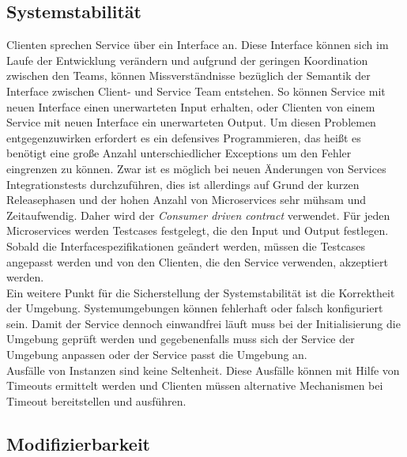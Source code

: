 \subsection{Systemstabilität}

Clienten sprechen Service über ein Interface an. Diese Interface können sich im Laufe der Entwicklung verändern und aufgrund der geringen Koordination zwischen den Teams, können Missverständnisse bezüglich der Semantik der Interface zwischen Client- und Service Team entstehen. So können Service mit neuen Interface einen unerwarteten Input erhalten, oder Clienten von einem Service mit neuen Interface ein unerwarteten Output. Um diesen Problemen entgegenzuwirken erfordert es ein defensives Programmieren, das heißt es benötigt eine große Anzahl unterschiedlicher Exceptions um den Fehler eingrenzen zu können. Zwar ist es möglich bei neuen Änderungen von Services Integrationstests durchzuführen, dies ist allerdings auf Grund der kurzen Releasephasen und der hohen Anzahl von Microservices sehr mühsam und Zeitaufwendig. Daher wird der \textit{Consumer driven contract} verwendet. Für jeden Microservices werden Testcases festgelegt, die den Input und Output festlegen. Sobald die Interfacespezifikationen geändert werden, müssen die Testcases angepasst werden und von den Clienten, die den Service verwenden, akzeptiert werden. \\
Ein weitere Punkt für die Sicherstellung der Systemstabilität ist die Korrektheit der Umgebung. Systemumgebungen können fehlerhaft oder falsch konfiguriert sein. Damit der Service dennoch einwandfrei läuft muss bei der Initialisierung die Umgebung geprüft werden und gegebenenfalls muss sich der Service der Umgebung anpassen oder der Service passt die Umgebung an.\\
Ausfälle von Instanzen sind keine Seltenheit. Diese Ausfälle können mit Hilfe von Timeouts ermittelt werden und Clienten müssen alternative Mechanismen bei Timeout bereitstellen und ausführen. 

\subsection{Modifizierbarkeit}

